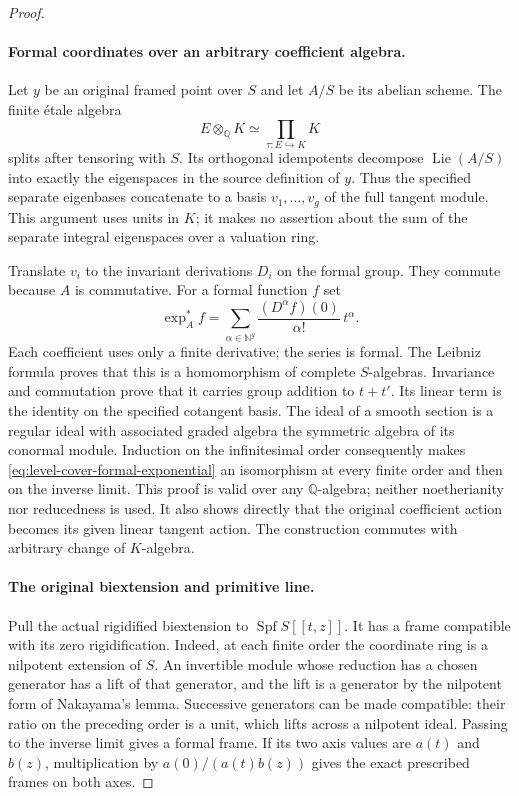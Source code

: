 \begin{proof}
\paragraph{Formal coordinates over an arbitrary coefficient algebra.}
Let $y$ be an original framed point over $S$ and let
$A/S$ be its abelian scheme.  The finite \'etale algebra
\[
                   E\otimes_{\mathbb Q}K
                       \simeq\prod_{\tau:E\hookrightarrow K}K
\]
splits after tensoring with $S$.  Its orthogonal idempotents decompose
$\operatorname{Lie}(A/S)$ into exactly the eigenspaces in the source
definition of $y$.  Thus the specified separate eigenbases concatenate
to a basis $v_1,\ldots,v_g$ of the full tangent module.  This argument
uses units in $K$; it makes no assertion about the sum of the separate
integral eigenspaces over a valuation ring.

Translate $v_i$ to the invariant derivations $D_i$ on the formal group.
They commute because $A$ is commutative.  For a formal function $f$ set
\begin{equation}\label{eq:level-cover-formal-exponential}
       \exp_A^*f
          =\sum_{\alpha\in\mathbb N^g}
             \frac{(D^\alpha f)(0)}{\alpha!}\,t^\alpha.
\end{equation}
Each coefficient uses only a finite derivative; the series is formal.
The Leibniz formula proves that this is a homomorphism of complete
$S$-algebras.  Invariance and commutation prove that it carries group
addition to $t+t'$.  Its linear term is the identity on the specified
cotangent basis.  The ideal of a smooth section is a regular ideal
with associated graded algebra the symmetric algebra of its conormal
module.  Induction on the infinitesimal order consequently makes
\eqref{eq:level-cover-formal-exponential} an isomorphism at every finite
order and then on the inverse limit.  This proof is valid over any
$\mathbb Q$-algebra; neither noetherianity nor reducedness is used.
It also shows directly that the original coefficient action becomes
its given linear tangent action.  The construction commutes with
arbitrary change of $K$-algebra.

\paragraph{The original biextension and primitive line.}
Pull the actual rigidified biextension to
$\operatorname{Spf}S[[t,z]]$.  It has a frame compatible with its
zero rigidification.  Indeed, at each finite order the coordinate ring
is a nilpotent extension of $S$.  An invertible module whose reduction
has a chosen generator has a lift of that generator, and the lift is a
generator by the nilpotent form of Nakayama's lemma.  Successive
generators can be made compatible: their ratio on the preceding order
is a unit, which lifts across a nilpotent ideal.  Passing to the inverse
limit gives a formal frame.  If its two axis values are $a(t)$ and
$b(z)$, multiplication by $a(0)/(a(t)b(z))$ gives the exact prescribed
frames on both axes.


\end{proof}
